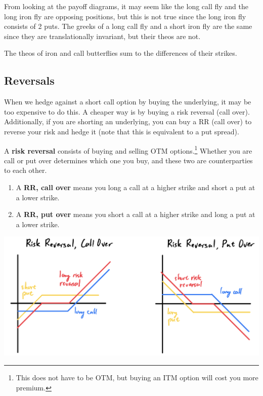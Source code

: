 \documentclass{article}
\begin{document}
    From looking at the payoff diagrams, it may seem like the long call fly and the long iron fly are opposing positions, but this is not true since the long iron fly consists of 2 puts. The greeks of a long call fly and a short iron fly are the same since they are translationally invariant, but their theos are not. 

    \begin{theorem}
      The theos of iron and call butterflies sum to the differences of their strikes. 
    \end{theorem}

  \subsection{Reversals}
  
    When we hedge against a short call option by buying the underlying, it may be too expensive to do this. A cheaper way is by buying a risk reversal (call over). Additionally, if you are shorting an underlying, you can buy a RR (call over) to reverse your risk and hedge it (note that this is equivalent to a put spread). 

    \begin{definition}
      A \textbf{risk reversal} consists of buying and selling OTM options.\footnote{This does not have to be OTM, but buying an ITM option will cost you more premium. } Whether you are call or put over determines which one you buy, and these two are counterparties to each other.  
      \begin{enumerate}
        \item A \textbf{RR, call over} means you long a call at a higher strike and short a put at a lower strike. 
        \item A \textbf{RR, put over} means you short a call at a higher strike and long a put at a lower strike. 
      \end{enumerate}
      \begin{center}
        \includegraphics[scale=0.3]{img/risk_reversal.png}
      \end{center}
    \end{definition}
\end{document}

